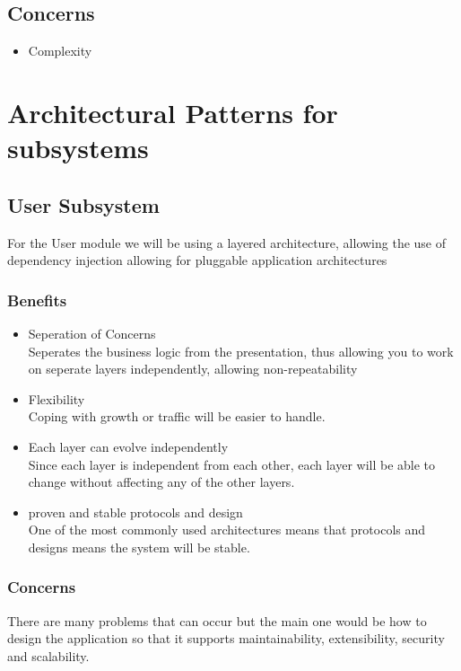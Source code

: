 \documentclass{article}
\begin{document}
 		\subsection{Concerns}
 			\begin{itemize}
 				\item Complexity
 				\bigskip
 				\\
 			\end{itemize}
 			 \section{Architectural Patterns for subsystems}
				\subsection{User Subsystem}
				For the User module we will be using a layered architecture, allowing the use of dependency injection allowing for pluggable application architectures
					\subsubsection{Benefits}
 						\begin{itemize}
 							\item Seperation of Concerns
 							\bigskip
 							\\
 							Seperates the business logic from the presentation, thus allowing you to work on seperate layers independently, allowing non-repeatability
 							\item Flexibility
 							\bigskip
 							\\
 							Coping with growth or traffic will be easier to handle.
 							\item Each layer can evolve independently
 							\bigskip
 							\\
 							Since each layer is independent from each other, each layer will be able to change without affecting any of the other layers.
 							\item proven and stable protocols and design
 							\bigskip
 							\\
 							 One of the most commonly used architectures means that protocols and designs means the system will be stable.
 						\end{itemize} 
	\subsubsection{Concerns}
 			
 				There are many problems that can occur but the main one would be how to design the application so that it supports maintainability, extensibility, security and scalability.
			
\end{document}
